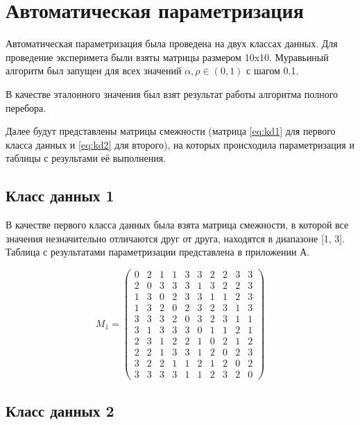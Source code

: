 \section{Автоматическая параметризация}

Автоматическая параметризация была проведена на двух классах данных. Для проведение эксперимета были взяты матрицы размером 10x10. Муравьиный алгоритм был запущен для всех значений $\alpha, \rho \in (0, 1)$ с шагом 0.1.

В качестве эталонного значения был взят результат работы алгоритма полного перебора. 

Далее будут представлены матрицы смежности (матрица \ref{eq:kd1} для первого класса данных и \ref{eq:kd2} для второго), на которых происходила параметризация и таблицы с результами её выполнения.

\subsection{Класс данных 1}

В качестве первого класса данных была взята матрица смежности, в которой все значения незначительно отличаются друг от друга, находятся в диапазоне [1, 3]. Таблица с результатами параметризации представлена в приложении А.

\begin{equation}
    \label{eq:kd1}
	M_{1} = \begin{pmatrix}
		0 & 2 & 1 & 1 & 3 & 3 & 2 & 2 & 3 & 3 \\
		2 & 0 & 3 & 3 & 3 & 1 & 3 & 2 & 2 & 3 \\
		1 & 3 & 0 & 2 & 3 & 3 & 1 & 1 & 2 & 3 \\
		1 & 3 & 2 & 0 & 2 & 3 & 2 & 3 & 1 & 3 \\
		3 & 3 & 3 & 2 & 0 & 3 & 2 & 3 & 1 & 1 \\
		3 & 1 & 3 & 3 & 3 & 0 & 1 & 1 & 2 & 1 \\
		2 & 3 & 1 & 2 & 2 & 1 & 0 & 2 & 1 & 2 \\
		2 & 2 & 1 & 3 & 3 & 1 & 2 & 0 & 2 & 3 \\
		3 & 2 & 2 & 1 & 1 & 2 & 1 & 2 & 0 & 2 \\
		3 & 3 & 3 & 3 & 1 & 1 & 2 & 3 & 2 & 0 
	\end{pmatrix}
\end{equation}

\subsection{Класс данных 2}

